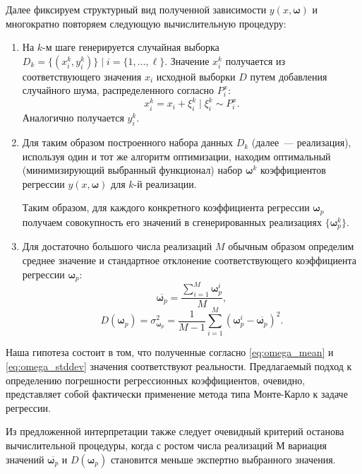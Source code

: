\documentclass[11pt,a4paper]{article}
\theoremstyle{definition}
\begin{document}
Далее фиксируем структурный вид полученной зависимости $y(x, \boldsymbol{\omega})$ и
многократно повторяем следующую вычислительную процедуру:
\begin{enumerate}
  \item На $k$-м шаге генерируется случайная выборка
	$D_k = \{ (x_i^k, y_i^k) \} \mid i = \{ 1, \dots, \ell \}$. Значение $x_i^k$
	получается из соответствующего значения $x_i$ исходной
	выборки $D$ путем добавления случайного шума, распределенного согласно
	$P_i^x$:
	\[
	  x_i^k = x_i + \xi_i^k \mid \xi_i^k \sim P_i^x.
	\]
	Аналогично получается $y_i^k$.
  \item Для таким образом построенного набора данных $D_k$
	(далее~--- реализация), используя один и тот же
    алгоритм оптимизации, находим оптимальный (минимизирующий выбранный
	функционал) набор $\boldsymbol{\omega}^k$ коэффициентов регрессии
	$y(x, \boldsymbol{\omega})$ для $k$-й реализации.

	Таким образом, для каждого конкретного коэффициента регрессии
	$\boldsymbol{\omega}_p$ получаем совокупность его значений в сгенерированных реализациях
	$\{ \boldsymbol{\omega}_p^k \}$.
  \item Для достаточно большого числа реализаций $M$ обычным образом определим
	  среднее значение и стандартное отклонение соответствующего
	  коэффициента регрессии $\boldsymbol{\omega}_p$:
	  \begin{equation}
		\label{eq:omega_mean}
		\overline{\boldsymbol{\omega}_p} = \frac{\sum_{i = 1}^M \boldsymbol{\omega}_p^i}{M},
	  \end{equation}
	  \begin{equation}
		\label{eq:omega_stddev}
		D(\boldsymbol{\omega}_p) = \sigma_{\boldsymbol{\omega}_p}^2 = \frac{1}{M - 1} \sum_{i = 1}^M (\boldsymbol{\omega}_p^i - \overline{\boldsymbol{\omega}_p})^2.
	  \end{equation}
\end{enumerate}

Наша гипотеза состоит в том, что полученные согласно \eqref{eq:omega_mean} и \eqref{eq:omega_stddev}
значения соответствуют реальности. Предлагаемый подход к определению
погрешности регрессионных коэффициентов, очевидно, представляет собой
фактически применение метода типа Монте-Карло к задаче регрессии.

Из предложенной интерпретации также следует очевидный критерий
останова вычислительной процедуры, когда с ростом числа реализаций $М$
вариация значений $\overline{\boldsymbol{\omega}_p}$ и
$D(\boldsymbol{\omega}_p)$ становится меньше экспертно выбранного
значения.
\end{document}
